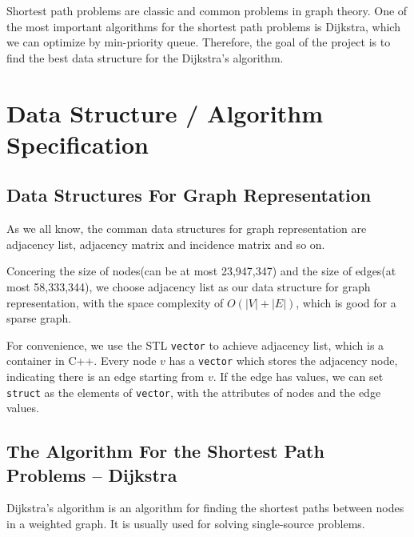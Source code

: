 \documentclass[twoside]{article}
\begin{document}
\begin{CJK*}{UTF8}{gbsn}
Shortest path problems are classic and common problems in graph theory. One of the most important algorithms for the shortest path problems is Dijkstra, which we can optimize by min-priority queue. Therefore, the goal of the project is to find the best data structure for the Dijkstra's algorithm.  

\section{Data Structure / Algorithm Specification}

\subsection{Data Structures For Graph Representation}

As we all know, the comman data structures for graph representation are adjacency list, adjacency matrix and incidence matrix and so on.

Concering the size of nodes(can be at most 23,947,347) and the size of edges(at most 58,333,344), we choose adjacency list\cite{666} as our data structure for graph representation, with the space complexity of $O(|V|+|E|)$, which is good for a sparse graph.  

For convenience, we use the STL \verb|vector| to achieve adjacency list, which is a container in C++. Every node $v$ has a \verb|vector| which stores the adjacency node, indicating there is an edge starting from $v$. If the edge has values, we can set \verb|struct| as the elements of \verb|vector|, with the attributes of nodes and the edge values.

\subsection{The Algorithm For the Shortest Path Problems -- Dijkstra}

Dijkstra's algorithm\cite{002} is an algorithm for finding the shortest paths between nodes in a weighted graph. It is usually used for solving single-source problems.  


\end{CJK*}
\end{document}
